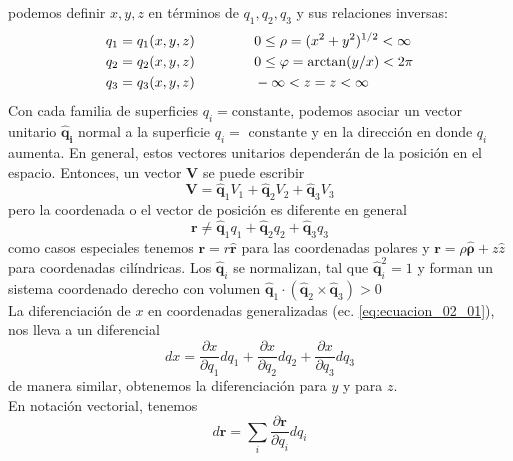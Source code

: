 podemos definir $x,y,z$ en términos de $q_{1}, q_{2}, q_{3}$ y sus relaciones inversas:
\begin{eqnarray}
\begin{aligned}
q_{1} = q_{1}(x,y,z) & \hspace{1.5cm} 0 \leq \rho = (x^{2} + y^{2})^{1/2} < \infty \\
q_{2} = q_{2}(x,y,z) & \hspace{1.5cm} 0 \leq \varphi = \arctan(y/x) < 2 \pi \\
q_{3} = q_{3}(x,y,z) & \hspace{1.5cm} - \infty < z = z < \infty
\end{aligned}
\label{eq:ecuacion_02_02}
\end{eqnarray}
Con cada familia de superficies $q_{i} = \mbox {constante}$, podemos asociar un vector unitario $\mathbf{\widehat{q}_{i}}$ normal a la superficie $q_{i} = \mbox{ constante}$ y en la dirección en donde $q_{i}$ aumenta. En general, estos vectores unitarios dependerán de la posición en el espacio. Entonces,  un vector $\mathbf{V}$ se puede escribir
\begin{equation}
\mathbf{V} = \mathbf{\widehat{q}}_{1} V_{1} +\mathbf{\widehat{q}}_{2} V_{2} + \mathbf{\widehat{q}}_{3} V_{3}
\label{eq:ecuacion_02_03}
\end{equation}
pero la coordenada o el vector de posición es diferente en general
\[ \mathbf{r} \neq \mathbf{\widehat{q}}_{1} q_{1} + \mathbf{\widehat{q}}_{2} q_{2} + \mathbf{\widehat{q}}_{3} q_{3} \]
como casos especiales tenemos $\mathbf{r} = r \mathbf{\widehat{r}}$ para las coordenadas polares y $\mathbf{r} = \rho \mathbf{\widehat{\rho}} + z \widehat{z}$ para coordenadas cilíndricas. Los $\mathbf{\widehat{q}}_{i}$ se normalizan, tal que $\mathbf{\widehat{q}}_{i}^{2} = 1$ y forman un sistema coordenado derecho con volumen $\mathbf{\widehat{q}}_{1} \cdot (\mathbf{\widehat{q}}_{2} \times \mathbf{\widehat{q}}_{3} ) > 0 $
\\
La diferenciación de $x$ en coordenadas generalizadas (ec. \ref{eq:ecuacion_02_01}), nos lleva a un diferencial
\begin{equation}
dx  = \dfrac{\partial x}{\partial q_{1}} d q_{1} + \dfrac{\partial x}{\partial q_{2}} d q_{2} + \dfrac{\partial x}{\partial q_{3}} d q_{3}
\label{eq:ecuacion_02_04}
\end{equation}
de manera similar, obtenemos la diferenciación para $y$ y para $z$.
\\
En notación vectorial, tenemos
\[ d \mathbf{r} = \sum_{i} \dfrac{\partial \mathbf{r}}{\partial q_{i}} d q_{i} \]
